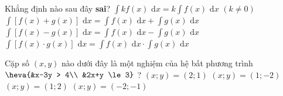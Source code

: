 \begin{ex}%
	Khẳng định nào sau đây \textbf{sai}?
	\choice
	{$\displaystyle\int\limits kf(x) \,\mathrm{\,d}x = k \displaystyle\int\limits f(x) \,\mathrm{\,d}x$ $(k\ne 0)$}
	{$\displaystyle\int\limits \left[f(x)+g(x)\right]\,\mathrm{\,d}x = \displaystyle\int\limits f(x)\,\mathrm{\,d}x+\displaystyle\int\limits g(x)\,\mathrm{\,d}x$}
	{$\displaystyle\int\limits \left[f(x)-g(x)\right]\,\mathrm{\,d}x=\displaystyle\int\limits f(x)\,\mathrm{\,d}x-\displaystyle\int\limits g(x)\,\mathrm{\,d}x$}
	{\True $\displaystyle\int\limits \left[f(x) \cdot g(x)\right]\,\mathrm{\,d}x=\displaystyle\int\limits f(x)\,\mathrm{\,d}x \cdot \displaystyle\int\limits g(x)\,\mathrm{\,d}x$}
\end{ex}

\begin{ex}%
	Cặp số $(x, y)$ nào dưới đây là một nghiệm của hệ bất phương trình $\heva{&x-3y > 4\\ &2x+y \le 3}$ ?
	\choice
	{$(x;y)=(2;1)$}
	{\True $(x;y)=(1;-2)$}
	{$(x;y)=(1;2)$}
	{$(x;y)=(-2;-1)$}
\end{ex}

